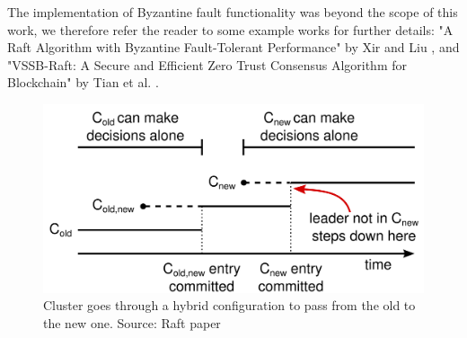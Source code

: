 The implementation of Byzantine fault functionality was beyond the scope of this work, we therefore refer the reader to some example works for further details: "A Raft Algorithm with Byzantine Fault-Tolerant Performance" by Xir and Liu \cite{liuXie}, and "VSSB-Raft: A Secure and Efficient Zero Trust Consensus Algorithm for Blockchain" by Tian et al. \cite{tianetal}.

\begin{figure}[h]
  \centering
  \includegraphics[width=.6\linewidth]{images/raftMembershipChange.png}
  \caption{Cluster goes through a hybrid configuration to pass from the old to the new one. Source: Raft paper \cite{raft}}
  \label{fig:configRaft}
\end{figure}
